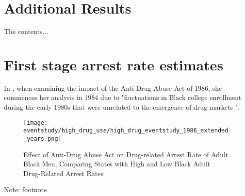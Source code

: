\documentclass{article}
\begin{document}
\begin{appendices}
  \section{Additional Results}
  The contents...
  \section{First stage arrest rate estimates}
  In \cite{britton2022}, when examining the impact of the Anti-Drug Abuse Act of 1986, she commences her analysis in 1984 due to "fluctuations in Black college enrollment during the early 1980s that were unrelated to the emergence of drug markets \cite{nces}".
  \clearpage

  \begin{figure}[h]
    \caption{Effect of Anti-Drug Abuse Act on Drug-related Arrest Rate of Adult Black Men, Comparing States with High and Low Black Adult Drug-Related Arrest Rates}
    \centering
    \texttt{[image: eventstudy/high\_drug\_use/high\_drug\_eventstudy\_1986\_extended\_years.png]}
    \label{fig:b1}
  \end{figure}

  \begin{footnotesize}
    \noindent Note: footnote
  \end{footnotesize}


\end{appendices}
\end{document}
